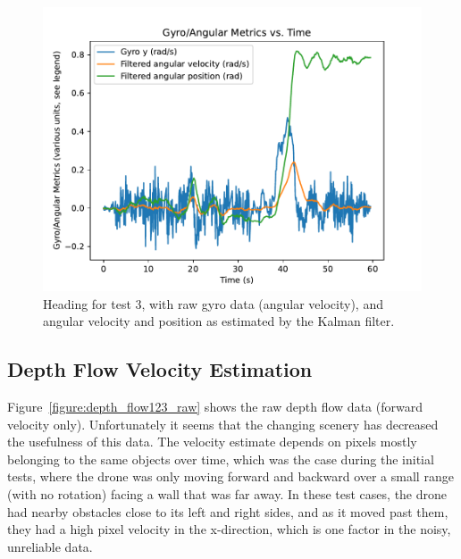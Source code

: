 \begin{figure}
	\centering
	\includegraphics[width=\linewidth]{./images/test3_yaw.pdf}
	\caption{Heading for test 3, with raw gyro data (angular velocity), and angular velocity and position as estimated by the Kalman filter.}
	\label{figure:test3_yaw}
\end{figure}

\subsection{Depth Flow Velocity Estimation}

Figure~\ref{figure:depth_flow123_raw} shows the raw depth flow data (forward velocity only).
Unfortunately it seems that the changing scenery has decreased the usefulness of this data.
The velocity estimate depends on pixels mostly belonging to the same objects over time,
which was the case during the initial tests, where the drone was only moving forward and backward
over a small range (with no rotation) facing a wall that was far away.
In these test cases, the drone had nearby obstacles close to its left and right sides,
and as it moved past them, they had a high pixel velocity in the x-direction,
which is one factor in the noisy, unreliable data.

